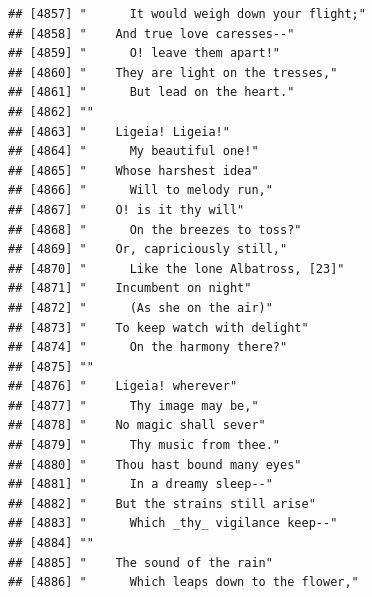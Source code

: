 \documentclass{article}\usepackage[]{graphicx}\usepackage[]{color}
\makeatletter
\newenvironment{kframe}{%
 \def\at@end@of@kframe{}%
 \ifinner\ifhmode%
  \def\at@end@of@kframe{\end{minipage}}%
  \begin{minipage}{\columnwidth}%
 \fi\fi%
 \def\FrameCommand##1{\hskip\@totalleftmargin \hskip-\fboxsep
 \colorbox{shadecolor}{##1}\hskip-\fboxsep
     \hskip-\linewidth \hskip-\@totalleftmargin \hskip\columnwidth}%
 \MakeFramed {\advance\hsize-\width
   \@totalleftmargin\z@ \linewidth\hsize
   \@setminipage}}%
 {\par\unskip\endMakeFramed%
 \at@end@of@kframe}
\newenvironment{knitrout}{}{} %
\makeatother
\begin{document}
\begin{knitrout}
\begin{kframe}
\begin{verbatim}
## [4857] "      It would weigh down your flight;"                                      
## [4858] "    And true love caresses--"                                                
## [4859] "      O! leave them apart!"                                                  
## [4860] "    They are light on the tresses,"                                          
## [4861] "      But lead on the heart."                                                
## [4862] ""                                                                            
## [4863] "    Ligeia! Ligeia!"                                                         
## [4864] "      My beautiful one!"                                                     
## [4865] "    Whose harshest idea"                                                     
## [4866] "      Will to melody run,"                                                   
## [4867] "    O! is it thy will"                                                       
## [4868] "      On the breezes to toss?"                                               
## [4869] "    Or, capriciously still,"                                                 
## [4870] "      Like the lone Albatross, [23]"                                         
## [4871] "    Incumbent on night"                                                      
## [4872] "      (As she on the air)"                                                   
## [4873] "    To keep watch with delight"                                              
## [4874] "      On the harmony there?"                                                 
## [4875] ""                                                                            
## [4876] "    Ligeia! wherever"                                                        
## [4877] "      Thy image may be,"                                                     
## [4878] "    No magic shall sever"                                                    
## [4879] "      Thy music from thee."                                                  
## [4880] "    Thou hast bound many eyes"                                               
## [4881] "      In a dreamy sleep--"                                                   
## [4882] "    But the strains still arise"                                             
## [4883] "      Which _thy_ vigilance keep--"                                          
## [4884] ""                                                                            
## [4885] "    The sound of the rain"                                                   
## [4886] "      Which leaps down to the flower,"                                       

\end{verbatim}
\end{kframe}
\end{knitrout}
\end{document}
